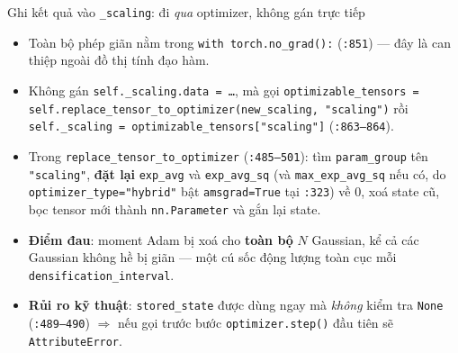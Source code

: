 \begin{frame}{Ghi kết quả vào \texttt{\_scaling}: đi \emph{qua} optimizer, không gán trực tiếp}
\footnotesize
\begin{itemize}\itemsep2pt
    \item Toàn bộ phép giãn nằm trong \texttt{with torch.no\_grad():} (\texttt{:851}) --- đây là can thiệp ngoài đồ thị tính đạo hàm.
    \item Không gán \texttt{self.\_scaling.data = \dots}, mà gọi
    \texttt{optimizable\_tensors = self.replace\_tensor\_to\_optimizer(new\_scaling, "scaling")} rồi
    \texttt{self.\_scaling = optimizable\_tensors["scaling"]} (\texttt{:863--864}).
    \item Trong \texttt{replace\_tensor\_to\_optimizer} (\texttt{:485--501}): tìm \texttt{param\_group} tên \texttt{"scaling"}, \textbf{đặt lại} \texttt{exp\_avg} và \texttt{exp\_avg\_sq} (và \texttt{max\_exp\_avg\_sq} nếu có, do \texttt{optimizer\_type="hybrid"} bật \texttt{amsgrad=True} tại \texttt{:323}) về $0$, xoá state cũ, bọc tensor mới thành \texttt{nn.Parameter} và gắn lại state.
    \item \textbf{Điểm đau}: moment Adam bị xoá cho \textbf{toàn bộ} $N$ Gaussian, kể cả các Gaussian không hề bị giãn --- một cú sốc động lượng toàn cục mỗi \texttt{densification\_interval}.
    \item \textbf{Rủi ro kỹ thuật}: \texttt{stored\_state} được dùng ngay mà \emph{không} kiểm tra \texttt{None} (\texttt{:489--490}) $\Rightarrow$ nếu gọi trước bước \texttt{optimizer.step()} đầu tiên sẽ \texttt{AttributeError}.
\end{itemize}
\end{frame}

